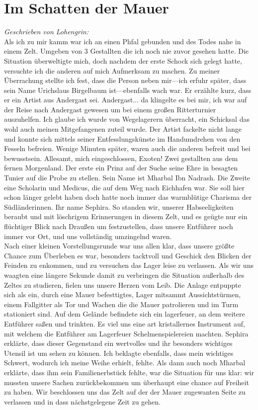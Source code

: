 \documentclass{book}
\begin{document}
    \tableofcontents

    \chapter{Im Schatten der Mauer}
    \emph{Geschrieben von Lohengrin:}\\
    Als ich zu mir kamm war ich an einen Phfal gebunden und des Todes nahe in einem Zelt. Umgeben von 3 Gestallten die ich noch nie zuvor gesehen hatte. Die Situation überweltigte mich, doch nachdem der erste Schock sich gelegt hatte, versuchte ich die anderen auf mich Aufmerksam zu machen. Zu meiner Überrachung stellte ich fest, dass die Person neben mir---ich erfuhr später, dass sein Name Urichslaus Birgelbaum ist---ebenfalls wach war. Er erzählte kurz, dass er ein Artist aus Andergast sei. Andergast... da klingelte es bei mir, ich war auf der Reise nach Andergast gewesen um bei einem großen Ritterturnier auszuhelfen. Ich glaube ich wurde von Wegelagerern überracht, ein Schicksal das wohl auch meinen Mitgefangenen zuteil wurde. Der Artist fackelte nicht lange und konnte sich mittels seiner Entfesslungskünste im Handumdrehen von den Fesseln befreien. Wenige Minuten später, waren auch die anderen befreit und bei bewusstsein. Allesamt, mich eingeschlossen, Exoten! Zwei gestallten aus dem fernen Morgenland. Der erste ein Prinz auf der Suche seine Ehre in besagten Tunier auf die Probe zu stellen. Sein Name ist Mharbal Ibn Nadrash. Die Zweite eine Scholarin und Medicus, die auf dem Weg nach Eichhafen war. Sie soll hier schon länger gelebt haben doch hatte noch immer das warmblütige Charisma der Südländerinnen. Ihr name Sephira. So standen wir, unserer Habseeligkeiten beraubt und mit löschrigem Erinnerungen in diesem Zelt, und es geügte nur ein flüchtiger Blick nach Draußen um festzustellen, dass unsere Entführer noch immer vor Ort, und uns vollständig umzingelnd waren.\\
    Nach einer kleinen Vorstellungsrunde war uns allen klar, dass unsere größte Chance zum Überleben es war, besonders tacktvoll und Geschick den Blicken der Feinden zu enkommen, und zu versuchen das Lager leise zu verlassen. Als wir uns waagten eine längere Sekunde damit zu verbringen die Situation außerhalb des Zeltes zu studieren, fielen uns unsere Herzen vom Leib. Die Anlage entpuppte sich als ein, durch eine Mauer befesttigtes, Lager mitsammt Aussichtstürmen, einem Fallgitter als Tor und Wachen die die Mauer patrolieren und im Turm stationiert sind. Auf dem Gelände befindete sich ein lagerfeuer, an dem weitere Entführer saßen und trinkten. Es viel uns eine art kristallernes Instrument auf, mit welchem die Entführer am Lagerfeuer Schelmenspielereien machten. Sephira erklärte, dass dieser Gegenstand ein wertvolles und ihr besonders wichtiges Utensil ist um sehen zu können. Ich beklagte ebenfalls, dass mein wichtiges Schwert, wodurch ich meine Weihe erhielt, fehlte. Als dann auch noch Mharbal erklärte, dass ihm sein Familienerbstück fehlte, war die Situation für uns klar: wir mussten unsere Sachen zurückbekommen um überhaupt eine chance auf Freiheit zu haben. Wir beschlossen uns das Zelt auf der der Mauer zugewanten Seite zu verlassen und in dass nächstgelegene Zeit zu gehen.\\
\end{document}
